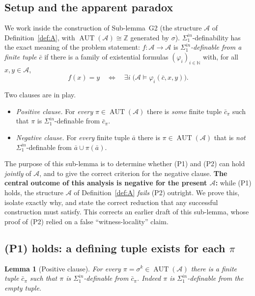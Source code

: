 \documentclass[12pt,fullpage]{article}
\newtheorem{lemma}[theorem]{Lemma}
\theoremstyle{definition}
\newcommand{\A}{\mathcal{A}}
\newcommand{\N}{\mathbb{N}}
\newcommand{\Z}{{\mathbb{Z}}}
\newcommand{\AUT}{\operatorname{AUT}}
\renewcommand{\phi}{\varphi}
\begin{document}
\subsection*{Setup and the apparent paradox}

We work inside the construction of Sub-lemma~G2 (the structure $\A$ of
Definition~\ref{def:A}, with $\AUT(\A)\cong\Z$ generated by $\sigma$).
$\Sigma^{in}_1$-definability has the exact meaning of the problem statement:
$f\colon\A\to\A$ is \emph{$\Sigma^{in}_1$-definable from a finite tuple
$\bar c$} if there is a family of existential formulas $(\phi_i)_{i\in\N}$
with, for all $x,y\in\A$,
\[
f(x)=y\quad\Longleftrightarrow\quad \exists i\;\bigl(\A\models\phi_i(\bar c,x,y)\bigr).
\tag{$\ast$}
\]

Two clauses are in play.
\begin{itemize}
\item[(P1)] \emph{Positive clause.} For \emph{every} $\pi\in\AUT(\A)$ there is
  \emph{some} finite tuple $\bar c_\pi$ such that $\pi$ is
  $\Sigma^{in}_1$-definable from $\bar c_\pi$.
\item[(P2)] \emph{Negative clause.} For \emph{every} finite tuple $\bar a$
  there is $\pi\in\AUT(\A)$ that is \emph{not} $\Sigma^{in}_1$-definable from
  $\bar a\cup\pi(\bar a)$.
\end{itemize}

The purpose of this sub-lemma is to determine whether (P1) and (P2) can hold
\emph{jointly} of $\A$, and to give the correct criterion for the negative
clause.  \textbf{The central outcome of this analysis is negative for the
present $\A$:} while (P1) holds, the structure $\A$ of Definition~\ref{def:A}
\emph{fails} (P2) outright.  We prove this, isolate exactly why, and state the
correct reduction that any successful construction must satisfy.  This corrects
an earlier draft of this sub-lemma, whose proof of (P2) relied on a false
``witness-locality'' claim.

\subsection*{(P1) holds: a defining tuple exists for each $\pi$}

\begin{lemma}[Positive clause]\label{lem:P1}
For every $\pi=\sigma^k\in\AUT(\A)$ there is a finite tuple $\bar c_\pi$ such
that $\pi$ is $\Sigma^{in}_1$-definable from $\bar c_\pi$.  Indeed $\pi$ is
$\Sigma^{in}_1$-definable from the \emph{empty} tuple.
\end{lemma}
\end{document}
